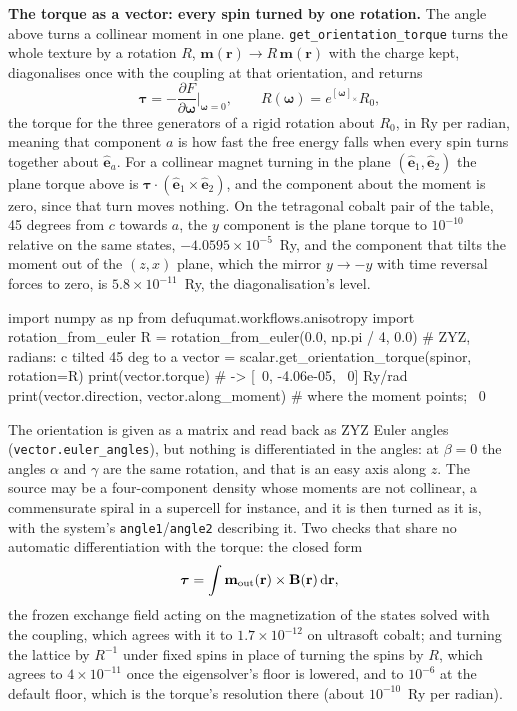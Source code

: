 \documentclass[11pt,a4paper]{article}
\newcommand{\code}[1]{\texttt{\small #1}}
\begin{document}
\textbf{The torque as a vector: every spin turned by one rotation.} The angle
above turns a collinear moment in one plane. \code{get\_orientation\_torque}
turns the whole texture by a rotation $R$, $\mathbf m(\mathbf r)\to
R\,\mathbf m(\mathbf r)$ with the charge kept, diagonalises once with the
coupling at that orientation, and returns
\begin{equation*}
  \boldsymbol\tau = -\frac{\partial F}{\partial\boldsymbol\omega}\bigg|_{\boldsymbol\omega=0},
  \qquad R(\boldsymbol\omega) = e^{[\boldsymbol\omega]_\times} R_0 ,
\end{equation*}
the torque for the three generators of a rigid rotation about $R_0$, in Ry per
radian, meaning that component $a$ is how fast the free energy falls when every
spin turns together about $\hat{\mathbf e}_a$. For a collinear magnet turning in
the plane $(\hat{\mathbf e}_1,\hat{\mathbf e}_2)$ the plane torque above is
$\boldsymbol\tau\cdot(\hat{\mathbf e}_1\times\hat{\mathbf e}_2)$, and the
component about the moment is zero, since that turn moves nothing. On the
tetragonal cobalt pair of the table, 45 degrees from $c$ towards $a$, the $y$
component is the plane torque to $10^{-10}$ relative on the same states,
$-4.0595\times10^{-5}$~Ry, and the component that tilts the moment out of the
$(z,x)$ plane, which the mirror $y\to-y$ with time reversal forces to zero, is
$5.8\times10^{-11}$~Ry, the diagonalisation's level.

\begin{pycode}
import numpy as np
from defuqumat.workflows.anisotropy import rotation_from_euler
R = rotation_from_euler(0.0, np.pi / 4, 0.0)     # ZYZ, radians: c tilted 45 deg to a
vector = scalar.get_orientation_torque(spinor, rotation=R)
print(vector.torque)                             # -> [~0, -4.06e-05, ~0] Ry/rad
print(vector.direction, vector.along_moment)     # where the moment points; ~0
\end{pycode}

\noindent The orientation is given as a matrix and read back as ZYZ Euler angles
(\code{vector.euler\_angles}), but nothing is differentiated in the angles: at
$\beta=0$ the angles $\alpha$ and $\gamma$ are the same rotation, and that is an
easy axis along $z$. The source may be a four-component density whose moments
are not collinear, a commensurate spiral in a supercell for instance, and it is
then turned as it is, with the system's \code{angle1}/\code{angle2} describing it.
Two checks that share no automatic differentiation with the torque: the closed
form
\begin{equation*}
  \boldsymbol\tau = \int \mathbf m_{\rm out}(\mathbf r)\times\mathbf B(\mathbf r)\,\mathrm d\mathbf r ,
\end{equation*}
the frozen exchange field acting on the magnetization of the states solved with
the coupling, which agrees with it to $1.7\times10^{-12}$ on ultrasoft cobalt;
and turning the lattice by $R^{-1}$ under fixed spins in place of turning the
spins by $R$, which agrees to $4\times10^{-11}$ once the eigensolver's floor is
lowered, and to $10^{-6}$ at the default floor, which is the torque's
resolution there (about $10^{-10}$~Ry per radian).
\end{document}
